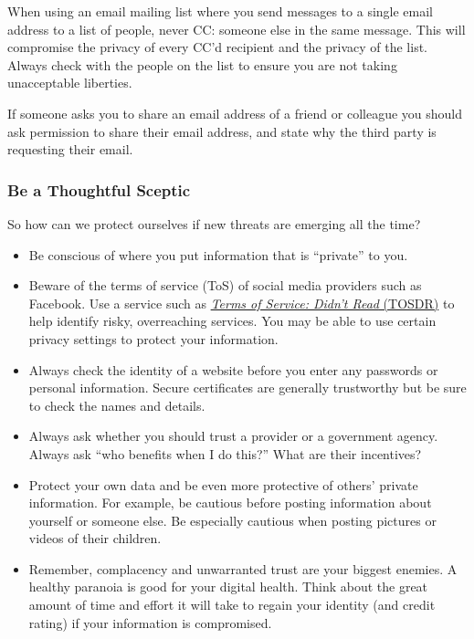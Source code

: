 \documentclass[
  letterpaper,
  DIV=11,
  numbers=noendperiod]{scrreprt}
\providecommand{\tightlist}{%
  \setlength{\itemsep}{0pt}\setlength{\parskip}{0pt}}\usepackage{longtable,booktabs,array}
\begin{document}
When using an email mailing list where you send messages to a single
email address to a list of people, never CC: someone else in the same
message. This will compromise the privacy of every CC'd recipient and
the privacy of the list. Always check with the people on the list to
ensure you are not taking unacceptable liberties.

If someone asks you to share an email address of a friend or colleague
you should ask permission to share their email address, and state why
the third party is requesting their email.

\subsubsection*{Be a Thoughtful Sceptic}\label{be-a-thoughtful-sceptic}

So how can we protect ourselves if new threats are emerging all the
time?

\begin{itemize}
\tightlist
\item
  Be conscious of where you put information that is ``private'' to you.
\item
  Beware of the terms of service (ToS) of social media providers such as
  Facebook. Use a service such as \href{https://tosdr.org/}{\emph{Terms
  of Service: Didn't Read} (TOSDR)} to help identify risky, overreaching
  services. You may be able to use certain privacy settings to protect
  your information.
\item
  Always check the identity of a website before you enter any passwords
  or personal information. Secure certificates are generally trustworthy
  but be sure to check the names and details.
\item
  Always ask whether you should trust a provider or a government agency.
  Always ask ``who benefits when I do this?'' What are their incentives?
\item
  Protect your own data and be even more protective of others' private
  information. For example, be cautious before posting information about
  yourself or someone else. Be especially cautious when posting pictures
  or videos of their children.
\item
  Remember, complacency and unwarranted trust are your biggest enemies.
  A healthy paranoia is good for your digital health. Think about the
  great amount of time and effort it will take to regain your identity
  (and credit rating) if your information is compromised.
\end{itemize}
\end{document}
